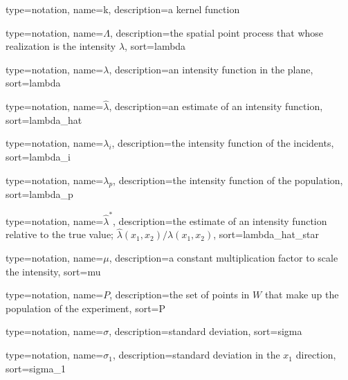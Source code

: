 {%
   type=notation,
   name={k},
   description={a kernel function}
}

{%
   type=notation,
   name={\ensuremath{\Lambda}},
   description={the spatial point process that whose realization is the intensity \ensuremath{\lambda}},
   sort={lambda}
}

{%
   type=notation,
   name={\ensuremath{\lambda}},
   description={an intensity function in the plane},
   sort={lambda}
}

{%
   type=notation,
   name={\ensuremath{\hat{\lambda}}},
   description={an estimate of an intensity function},
   sort={lambda_hat}
}

{%
   type=notation,
   name={\ensuremath{\lambda_i}},
   description={the intensity function of the incidents},
   sort={lambda_i}
}

{%
   type=notation,
   name={\ensuremath{\lambda_p}},
   description={the intensity function of the population},
   sort={lambda_p}
}

{%
   type=notation,
   name={\ensuremath{\hat{\lambda}^*}},
   description={the estimate of an intensity function relative to the true value; \ensuremath{\hat{\lambda}(x_1, x_2)/\lambda(x_1, x_2)}},
   sort={lambda_hat_star}
}

{%
   type=notation,
   name={\ensuremath{\mu}},
   description={a constant multiplication factor to scale the intensity},
   sort={mu}
}

{%
   type=notation,
   name={\ensuremath{P}},
   description={the set of points in \ensuremath{W} that make up the population of the experiment},
   sort={P}
}

{%
   type=notation,
   name={\ensuremath{\sigma}},
   description={standard deviation},
   sort={sigma}
}

{%
   type=notation,
   name={\ensuremath{\sigma_1}},
   description={standard deviation in the \ensuremath{x_1} direction},
   sort={sigma_1}
}

